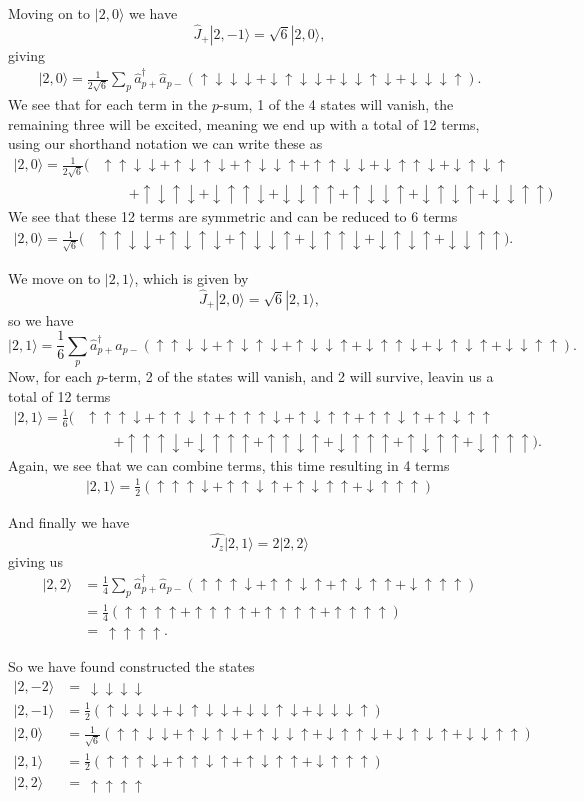 \documentclass[a4paper, 11pt, notitlepage, english]{article}
\newcommand{\ket}[1]{|#1 \rangle}
\newcommand{\op}[1]{\hat{#1}}
\renewcommand{\d}{{\rm d}}
\renewcommand{\u}{\uparrow}
\renewcommand{\d}{\downarrow}
\newcommand{\dddd}{\d\d\d\d}
\newcommand{\uddd}{\u\d\d\d}
\newcommand{\dudd}{\d\u\d\d}
\newcommand{\ddud}{\d\d\u\d}
\newcommand{\dddu}{\d\d\d\u}
\newcommand{\uudd}{\u\u\d\d}
\newcommand{\udud}{\u\d\u\d}
\newcommand{\uddu}{\u\d\d\u}
\newcommand{\duud}{\d\u\u\d}
\newcommand{\dudu}{\d\u\d\u}
\newcommand{\dduu}{\d\d\u\u}
\newcommand{\uuud}{\u\u\u\d}
\newcommand{\uudu}{\u\u\d\u}
\newcommand{\uduu}{\u\d\u\u}
\newcommand{\duuu}{\d\u\u\u}
\newcommand{\uuuu}{\u\u\u\u}
\begin{document}
Moving on to $\ket{2, 0}$ we have
$$\op{J}_+ \ket{2, -1} = \sqrt{6}\ket{2, 0},$$
giving
\begin{align*}
\ket{2, 0} = \frac{1}{2\sqrt{6}} \sum_p \op{a}_{p+}^\dagger\op{a}_{p-}(\uddd + \dudd + \ddud + \dddu).
\end{align*}
We see that for each term in the $p$-sum, 1 of the 4 states will vanish, the remaining three will be excited, meaning we end up with a total of 12 terms, using our shorthand notation we can write these as
\begin{align*}
\ket{2, 0} = \frac{1}{2\sqrt{6}} (
&\uudd + \udud + \uddu 
+ \uudd + \duud + \dudu \\
&\qquad+ \udud + \duud + \dduu
+ \uddu + \dudu + \dduu)
\end{align*}
We see that these 12 terms are symmetric and can be reduced to 6 terms
\begin{align*}
\ket{2, 0} = \frac{1}{\sqrt{6}} (
&\uudd + \udud + \uddu 
+ \duud + \dudu + \dduu ).
\end{align*}

We move on to $\ket{2,1}$, which is given by
$$\op{J}_+\ket{2, 0} = \sqrt{6}\ket{2, 1},$$
so we have
$$\ket{2,1} = \frac{1}{6} \sum_p \op{a}_{p+}^\dagger\op{a}_{p-}(
\uudd + \udud + \uddu 
+ \duud + \dudu + \dduu ). $$
Now, for each $p$-term, 2 of the states will vanish, and 2 will survive, leavin us a total of 12 terms
\begin{align*}
\ket{2,1} = \frac{1}{6} (&
\uuud + \uudu
+ \uuud + \uduu
+ \uudu + \uduu \\
&\qquad + \uuud + \duuu
+ \uudu + \duuu
+ \uduu + \duuu).
\end{align*}
Again, we see that we can combine terms, this time resulting in 4 terms
\begin{align*}
\ket{2,1} = \frac{1}{2} (\uuud +  \uudu + \uduu +\duuu)
\end{align*}

And finally we have
$$\op{J_z}\ket{2,1} = 2\ket{2,2}$$
giving us
\begin{align*}
\ket{2,2} &= \frac{1}{4} \sum_p \op{a}_{p+}^\dagger\op{a}_{p-}(\uuud +  \uudu + \uduu +\duuu) \\
&= \frac{1}{4} (\uuuu +  \uuuu + \uuuu +\uuuu) \\
&= \ \uuuu.
\end{align*}

So we have found constructed the states
\begin{align*}
\ket{2, -2} &= \ \dddd \\
\ket{2, -1} &= \frac{1}{2}(\uddd + \dudd + \ddud + \dddu) \\
\ket{2, 0}  &= \frac{1}{\sqrt{6}} (\uudd + \udud + \uddu + \duud + \dudu + \dduu) \\
\ket{2, 1}  &= \frac{1}{2} (\uuud +  \uudu + \uduu +\duuu) \\
\ket{2, 2}  &= \ \uuuu
\end{align*}
\end{document}
